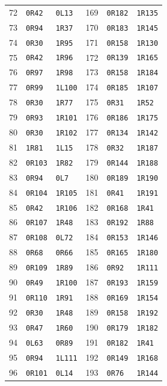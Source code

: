 \begin{longtable}{@{}rll@{\qquad}rll@{}}
72&\texttt{0R42}&\texttt{0L13}&169&\texttt{0R182}&\texttt{1R135}\\
73&\texttt{0R94}&\texttt{1R37}&170&\texttt{0R183}&\texttt{1R145}\\
74&\texttt{0R30}&\texttt{1R95}&171&\texttt{0R158}&\texttt{1R130}\\
75&\texttt{0R42}&\texttt{1R96}&172&\texttt{0R139}&\texttt{1R165}\\
76&\texttt{0R97}&\texttt{1R98}&173&\texttt{0R158}&\texttt{1R184}\\
77&\texttt{0R99}&\texttt{1L100}&174&\texttt{0R185}&\texttt{1R107}\\
78&\texttt{0R30}&\texttt{1R77}&175&\texttt{0R31}&\texttt{1R52}\\
79&\texttt{0R93}&\texttt{1R101}&176&\texttt{0R186}&\texttt{1R175}\\
80&\texttt{0R30}&\texttt{1R102}&177&\texttt{0R134}&\texttt{1R142}\\
81&\texttt{1R81}&\texttt{1L15}&178&\texttt{0R32}&\texttt{1R187}\\
82&\texttt{0R103}&\texttt{1R82}&179&\texttt{0R144}&\texttt{1R188}\\
83&\texttt{0R94}&\texttt{0L7}&180&\texttt{0R189}&\texttt{1R190}\\
84&\texttt{0R104}&\texttt{1R105}&181&\texttt{0R41}&\texttt{1R191}\\
85&\texttt{0R42}&\texttt{1R106}&182&\texttt{0R168}&\texttt{1R41}\\
86&\texttt{0R107}&\texttt{1R48}&183&\texttt{0R192}&\texttt{1R88}\\
87&\texttt{0R108}&\texttt{0L72}&184&\texttt{0R153}&\texttt{1R146}\\
88&\texttt{0R68}&\texttt{0R66}&185&\texttt{0R165}&\texttt{1R180}\\
89&\texttt{0R109}&\texttt{1R89}&186&\texttt{0R92}&\texttt{1R111}\\
90&\texttt{0R49}&\texttt{1R100}&187&\texttt{0R193}&\texttt{1R159}\\
91&\texttt{0R110}&\texttt{1R91}&188&\texttt{0R169}&\texttt{1R154}\\
92&\texttt{0R30}&\texttt{1R48}&189&\texttt{0R158}&\texttt{1R192}\\
93&\texttt{0R47}&\texttt{1R60}&190&\texttt{0R179}&\texttt{1R182}\\
94&\texttt{0L63}&\texttt{0R89}&191&\texttt{0R182}&\texttt{1R41}\\
95&\texttt{0R94}&\texttt{1L111}&192&\texttt{0R149}&\texttt{1R168}\\
96&\texttt{0R101}&\texttt{0L14}&193&\texttt{0R76}&\texttt{1R144}\\
\end{longtable}
\endgroup
